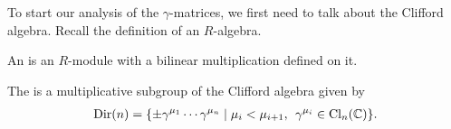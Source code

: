 \documentclass[11pt]{article}
\begin{document}
To start our analysis of the $\gamma$-matrices, we first need to talk 
about the Clifford algebra. Recall the definition of an $R$-algebra.

\begin{definition}
    An  is an $R$-module with a bilinear multiplication
    defined on it.
\end{definition}

\begin{definition}
\end{definition}

\begin{definition}
    The  is a multiplicative subgroup of the Clifford algebra
    given by 
    \begin{align*}
        {\rm Dir}(n) = \{ \pm \gamma^{\mu_1} \cdots \gamma^{\mu_n} \mid \mu_i < \mu_{i + 1}, \: \: \gamma^{\mu_i} \in \operatorname{Cl}_n(\mathbb{C}) \}.
    \end{align*}
\end{definition}
\end{document}
